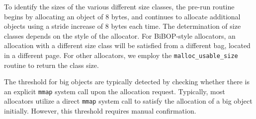To identify the sizes of the various different size classes, the pre-run routine begins by allocating an object of 8 bytes, and continues to allocate additional objects using a stride increase of 8 bytes each time. The determination of size classes depends on the style of the allocator. For BiBOP-style allocators, an allocation with a different size class will be satisfied from a different bag, located in a different page. For other allocators, we employ the \texttt{malloc\_usable\_size} routine to return the class size. 

The threshold for big objects are typically detected by checking whether there is an explicit \texttt{mmap} system call upon the allocation request. Typically, most allocators utilize a direct \texttt{mmap} system call to satisfy the allocation of a big object initially. However, this threshold requires manual confirmation. 
